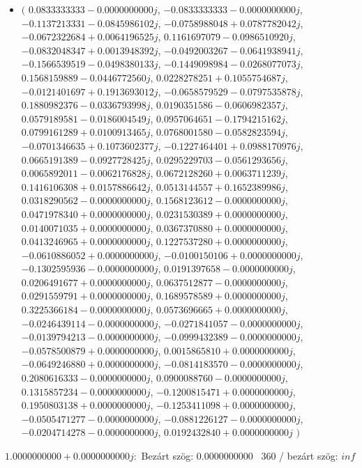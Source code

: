 \documentclass[14pt,a4paper]{article}
\begin{document}
\begin{itemize}
\item
$\big($
$0.0833333333-0.0000000000j$, $-0.0833333333-0.0000000000j$, $-0.1137213331-0.0845986102j$, $-0.0758988048+0.0787782042j$, $-0.0672322684+0.0064196525j$, $0.1161697079-0.0986510920j$, $-0.0832048347+0.0013948392j$, $-0.0492003267-0.0641938941j$, $-0.1566539519-0.0498380133j$, $-0.1449098984-0.0268077073j$, $0.1568159889-0.0446772560j$, $0.0228278251+0.1055754687j$, $-0.0121401697+0.1913693012j$, $-0.0658579529-0.0797535878j$, $0.1880982376-0.0336793998j$, $0.0190351586-0.0606982357j$, $0.0579189581-0.0186004549j$, $0.0957064651-0.1794215162j$, $0.0799161289+0.0100913465j$, $0.0768001580-0.0582823594j$, $-0.0701346635+0.1073602377j$, $-0.1227464401+0.0988170976j$, $0.0665191389-0.0927728425j$, $0.0295229703-0.0561293656j$, $0.0065892011-0.0062176828j$, $0.0672128260+0.0063711239j$, $0.1416106308+0.0157886642j$, $0.0513144557+0.1652389986j$, $0.0318290562-0.0000000000j$, $0.1568123612-0.0000000000j$, $0.0471978340+0.0000000000j$, $0.0231530389+0.0000000000j$, $0.0140071035+0.0000000000j$, $0.0367370880+0.0000000000j$, $0.0413246965+0.0000000000j$, $0.1227537280+0.0000000000j$, $-0.0610886052+0.0000000000j$, $-0.0100150106+0.0000000000j$, $-0.1302595936-0.0000000000j$, $0.0191397658-0.0000000000j$, $0.0206491677+0.0000000000j$, $0.0637512877-0.0000000000j$, $0.0291559791+0.0000000000j$, $0.1689578589+0.0000000000j$, $0.3225366184-0.0000000000j$, $0.0573696665+0.0000000000j$, $-0.0246439114-0.0000000000j$, $-0.0271841057-0.0000000000j$, $-0.0139794213-0.0000000000j$, $-0.0999432389-0.0000000000j$, $-0.0578500879+0.0000000000j$, $0.0015865810+0.0000000000j$, $-0.0649246880+0.0000000000j$, $-0.0814183570-0.0000000000j$, $0.2080616333-0.0000000000j$, $0.0900088760-0.0000000000j$, $0.1315857234-0.0000000000j$, $-0.1200815471+0.0000000000j$, $0.1950803138+0.0000000000j$, $-0.1253411098+0.0000000000j$, $-0.0505471277-0.0000000000j$, $-0.0881226127-0.0000000000j$, $-0.0204714278-0.0000000000j$, $0.0192432840+0.0000000000j$
$\big)$
\end{itemize}
$1.0000000000+0.0000000000j$:\
Bezárt szög: $0.0000000000$ \
360 / bezárt szög: $inf$\
\end{document}

